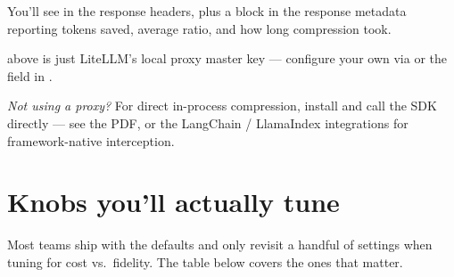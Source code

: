 \documentclass[10pt]{article}
\begin{document}
You'll see  in the
response headers, plus a  block in the
response metadata reporting tokens saved, average ratio, and how long
compression took.

 above is just LiteLLM's local proxy master key
— configure your own via  or the
 field in .

\textit{Not using a proxy?} For direct in-process compression, install
 and call the SDK directly — see the
 PDF, or the LangChain / LlamaIndex
integrations for framework-native interception.

\section{Knobs you'll actually tune}

Most teams ship with the defaults and only revisit a handful of settings
when tuning for cost vs.\ fidelity. The table below covers the ones that
matter.
\end{document}
